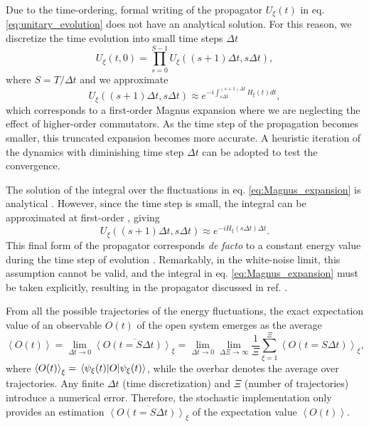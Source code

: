 \documentclass[12pt, amsmath, amssymb, graphicx]{iopart}
\begin{document}
Due to the time-ordering, formal writing of the propagator $U_{\xi}(t)$ in eq. \ref{eq:unitary_evolution} does not have an analytical solution. For this reason, we discretize the time evolution into small time steps $\Delta t$
%
\begin{equation}
    U_{\xi}(t, 0) = \prod_{s=0}^{S-1} U_{\xi}((s+1) \Delta t, s \Delta t),
\end{equation}
%
where $S=T/\Delta t$ and we approximate
%
\begin{equation} \label{eq:Magnus_expansion}
    U_{\xi}((s+1) \Delta t, s \Delta t) \approx e^{-i \int_{s \Delta t}^{(s+1) \Delta t} H_{\xi}(t) dt},
\end{equation}
%
which corresponds to a first-order Magnus expansion \cite{Magnus1954, Iserles2000, Kormann2008,Tannor2006} where we are neglecting the effect of higher-order commutators. As the time step of the propagation becomes smaller, this truncated expansion becomes more accurate. A heuristic iteration of the dynamics with diminishing time step $\Delta t$ can be adopted to test the convergence. 

The solution of the integral over the fluctuations in eq. \ref{eq:Magnus_expansion} is analytical \cite{Gillespie1996}. However, since the time step is small, the integral can be approximated at first-order \cite{Gillespie1996}, giving 
%
\begin{equation} \label{eq:unitary_propagator}
    U_{\xi}((s+1) \Delta t, s \Delta t) \approx e^{-i H_{\xi}\left( s \Delta t \right) \Delta t}.
\end{equation}
%
This final form of the propagator corresponds \textit{de facto} to a constant energy value during the time step of evolution \cite{Bondarenko2020, Jansen2006}.
Remarkably, in the white-noise limit, this assumption cannot be valid, and the integral in eq. \ref{eq:Magnus_expansion} must be taken explicitly, resulting in the propagator discussed in ref. \cite{Gallina2022}.

From all the possible trajectories of the energy fluctuations, the exact expectation value of an observable $O(t)$ of the open system emerges as the average
%
\begin{equation} \label{eq:exact_expectation}
    \left\langle O(t) \right\rangle = \lim_{\Delta t \rightarrow 0} \overline{\left\langle O(t = S \Delta t) \right\rangle_{\xi}} = \lim_{\Delta t \rightarrow 0} \lim_{\Delta \Xi \rightarrow \infty} \frac{1}{\Xi} \sum_{\xi = 1}^{\Xi} \left\langle O(t = S \Delta t) \right\rangle_{\xi},
\end{equation}
%
where $\left\langle O(t) \right\rangle_{\xi} = \expval{O}{\psi_{\xi}(t)}$, while the overbar denotes the average over trajectories. Any finite $\Delta t$ (time discretization) and $\Xi$ (number of trajectories) introduce a numerical error. Therefore, the stochastic implementation only provides an estimation $\overline{\left\langle 
O(t=S\Delta t) \right\rangle_{\xi}}$ of the expectation value $\left\langle O(t) \right\rangle$.
\end{document}
